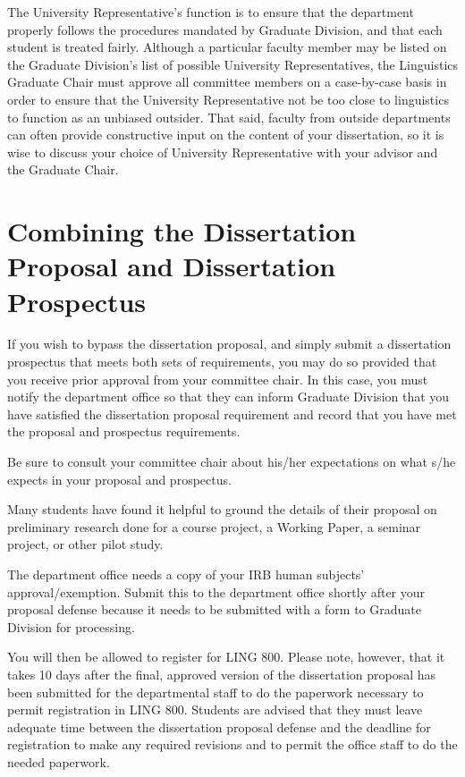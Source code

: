 \documentclass[
]{book}
\begin{document}
The University Representative's function is to ensure that the department properly follows the procedures mandated by Graduate Division, and that each student is treated fairly. Although a particular faculty member may be listed on the Graduate Division's list of possible University Representatives, the Linguistics Graduate Chair must approve all committee members on a case-by-case basis in order to ensure that the University Representative not be too close to linguistics to function as an unbiased outsider. That said, faculty from outside departments can often provide constructive input on the content of your dissertation, so it is wise to discuss your choice of University Representative with your advisor and the Graduate Chair.

\section{Combining the Dissertation Proposal and Dissertation Prospectus}\label{combining-the-dissertation-proposal-and-dissertation-prospectus}

If you wish to bypass the dissertation proposal, and simply submit a dissertation prospectus that meets both sets of requirements, you may do so provided that you receive prior approval from your committee chair. In this case, you must notify the department office so that they can inform Graduate Division that you have satisfied the dissertation proposal requirement and record that you have met the proposal and prospectus requirements.

Be sure to consult your committee chair about his/her expectations on what s/he expects in your proposal and prospectus.

Many students have found it helpful to ground the details of their proposal on preliminary research done for a course project, a Working Paper, a seminar project, or other pilot study.

The department office needs a copy of your IRB human subjects' approval/exemption. Submit this to the department office shortly after your proposal defense because it needs to be submitted with a form to Graduate Division for processing.

You will then be allowed to register for LING 800. Please note, however, that it takes 10 days after the final, approved version of the dissertation proposal has been submitted for the departmental staff to do the paperwork necessary to permit registration in LING 800. Students are advised that they must leave adequate time between the dissertation proposal defense and the deadline for registration to make any required revisions and to permit the office staff to do the needed paperwork.
\end{document}
